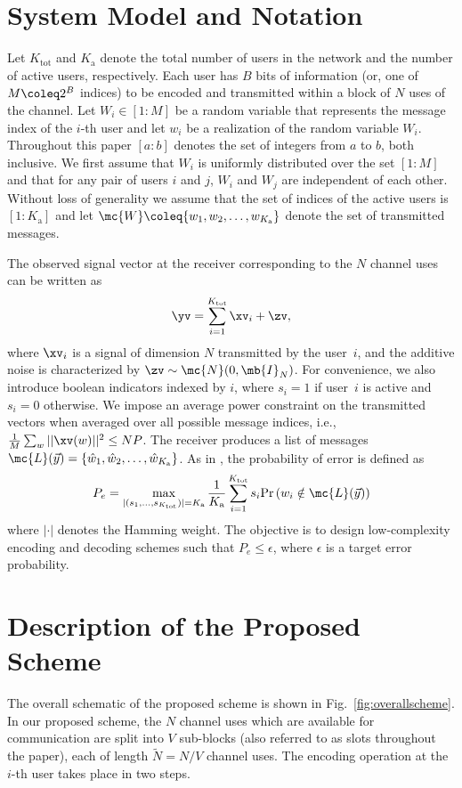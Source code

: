 \documentclass[final,onecolumn,12pt]{IEEEtran}
\def\Ktot{K_{\text{tot}}}
\def\Ka{K_{\text{a}}}
\def\Pr{\mathrm{Pr}}
\begin{document}
\section{System Model and Notation}
\label{Sec:SystemModel}
Let $\Ktot$ and $\Ka$ denote the total number of users in the network and the number of active users, respectively.  Each user has $B$ bits of information (or, one of $M \coleq 2^B$ indices) to be encoded and transmitted within a block of $N$ uses of the channel. Let $W_i \in [1:M]$ be a random variable that represents the message index of the $i$-th user and let $w_i$ be a realization of the random variable $W_i$. Throughout this paper $[a:b]$ denotes the set of integers from $a$ to $b$, both inclusive. We first assume that $W_i$ is uniformly distributed over the set $[1:M]$ and that for any pair of users $i$ and $j$, $W_i$ and $W_j$ are independent of each other.  Without loss of generality we assume that the set of indices of the active users is $[1:\Ka]$ and let $\mc{W}\coleq\{w_1,w_2,\ldots,w_{\Ka}\}$ denote the set of transmitted messages.

The observed signal vector at the receiver corresponding to the $N$ channel uses can be written as
\begin{equation}
\yv = \sum_{i=1}^{\Ktot} \xv_{i} + \zv,
\end{equation}
where $\xv_i$ is a signal of dimension $N$ transmitted by the user~$i$, and the additive noise is characterized by $\zv \sim \mc{N}(0,\mb{I}_N)$. For convenience, we also introduce boolean indicators indexed by $i$, where $s_i =1$ if user~$i$ is active and $s_i = 0$ otherwise. We impose an average power constraint on the transmitted vectors when averaged over all possible message indices, i.e., $\frac{1}{M}\sum_{w} ||\xv(w)||^2\leq NP$.  The receiver produces a list of messages $\mc{L}(\vec{y}) = \{\hat{w}_1,\hat{w}_2,\ldots,\hat{w}_{\Ka} \}$. As in \cite{ordentlich17}, the probability of error is defined as
\begin{equation}\label{eqn:proboferrordefinition}
  P_e = \max_{|(s_1,\ldots,s_{\Ktot})| = \Ka} \frac{1}{\Ka} \sum_{i=1}^{\Ktot} s_i \Pr\left( w_i \notin \mc{L}(\vec{y}) \right)
\end{equation}
where $|\cdot|$ denotes the Hamming weight. The objective is to design low-complexity encoding and decoding schemes such that $P_e \leq \epsilon$, where $\epsilon$ is a target error probability.

\section{Description of the Proposed Scheme}
The overall schematic of the proposed scheme is shown in Fig.~\ref{fig:overallscheme}. In our proposed scheme, the $N$ channel uses which are available for communication are split into $V$ sub-blocks (also referred to as slots throughout the paper), each of length $\tilde{N}=N/V$ channel uses. The encoding operation at the $i$-th user takes place in two steps.
\end{document}
